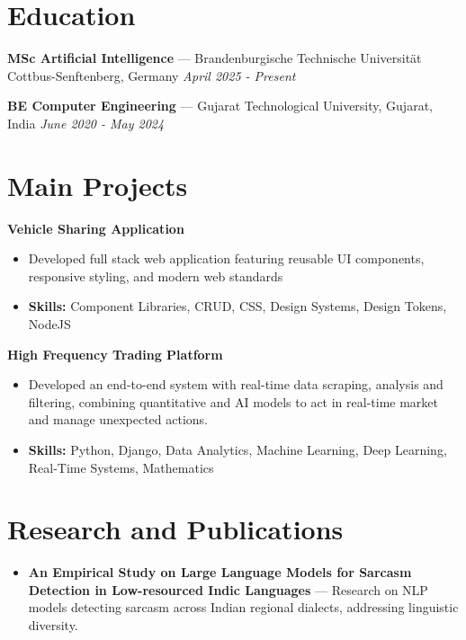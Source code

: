 \documentclass[a4paper,10pt]{article}
\begin{document}
\section*{Education}
\textbf{MSc Artificial Intelligence} — Brandenburgische Technische Universität Cottbus-Senftenberg, Germany \hfill \textit{April 2025 - Present}\par
\vspace{1.5pt}
\textbf{BE Computer Engineering} — Gujarat Technological University, Gujarat, India \hfill \textit{June 2020 - May 2024}\par

\section*{Main Projects}
\textbf{Vehicle Sharing Application}\par
\vspace{1pt}
\begin{itemize}
  \item Developed full stack web application featuring reusable UI components, responsive styling, and modern web standards
  \item \textbf{Skills:} Component Libraries, CRUD, CSS, Design Systems, Design Tokens, NodeJS
\end{itemize}
\vspace{3pt}
\textbf{High Frequency Trading Platform}\par
\vspace{1pt}
\begin{itemize}
  \item Developed an end-to-end system with real-time data scraping, analysis and filtering, combining quantitative and AI models to act in real-time market and manage unexpected actions.
  \item \textbf{Skills:} Python, Django, Data Analytics, Machine Learning, Deep Learning, Real-Time Systems, Mathematics
\end{itemize}

\section*{Research and Publications}
\begin{itemize}
\item \textbf{An Empirical Study on Large Language Models for Sarcasm Detection in Low-resourced Indic Languages} — Research on NLP models detecting sarcasm across Indian regional dialects, addressing linguistic diversity.
\end{itemize}
\end{document}

